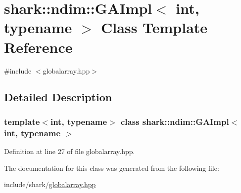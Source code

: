 \hypertarget{classshark_1_1ndim_1_1_g_a_impl}{}\section{shark\+:\+:ndim\+:\+:G\+A\+Impl$<$ int, typename $>$ Class Template Reference}
\label{classshark_1_1ndim_1_1_g_a_impl}


{\ttfamily \#include $<$globalarray.\+hpp$>$}



\subsection{Detailed Description}
\subsubsection*{template$<$int, typename$>$\newline
class shark\+::ndim\+::\+G\+A\+Impl$<$ int, typename $>$}



Definition at line 27 of file globalarray.\+hpp.



The documentation for this class was generated from the following file\+:\begin{DoxyCompactItemize}
\item 
include/shark/\hyperlink{globalarray_8hpp}{globalarray.\+hpp}\end{DoxyCompactItemize}
